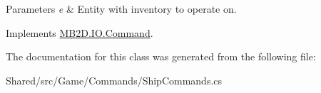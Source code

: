 \begin{DoxyParams}{Parameters}
{\em e} & Entity with inventory to operate on.\\
\hline
\end{DoxyParams}


Implements \hyperlink{class_m_b2_d_1_1_i_o_1_1_command_ae927e36c0e285848325cc68eddb5fd72}{M\+B2\+D.\+I\+O.\+Command}.



The documentation for this class was generated from the following file\+:\begin{DoxyCompactItemize}
\item 
Shared/src/\+Game/\+Commands/Ship\+Commands.\+cs\end{DoxyCompactItemize}
